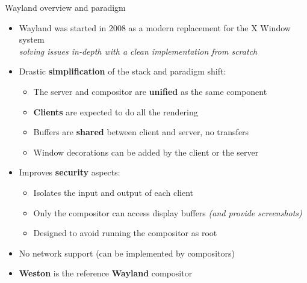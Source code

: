 \begin{frame}{Wayland overview and paradigm}
  \begin{itemize}
  \item Wayland was started in 2008 as a modern replacement for the X Window system\\
    \textit{solving issues in-depth with a clean implementation from scratch}
  \item Drastic \textbf{simplification} of the stack and paradigm shift:
    \begin{itemize}
    \item The server and compositor are \textbf{unified} as the same component
    \item \textbf{Clients} are expected to do all the rendering
    \item Buffers are \textbf{shared} between client and server, no transfers
    \item Window decorations can be added by the client or the server
    \end{itemize}
  \item Improves \textbf{security} aspects:
    \begin{itemize}
    \item Isolates the input and output of each client
    \item Only the compositor can access display buffers \textit{(and provide screenshots)}
    \item Designed to avoid running the compositor as root
    \end{itemize}
  \item No network support (can be implemented by compositors)
  \item \textbf{Weston} is the reference \textbf{Wayland} compositor
  \end{itemize}
\end{frame}

